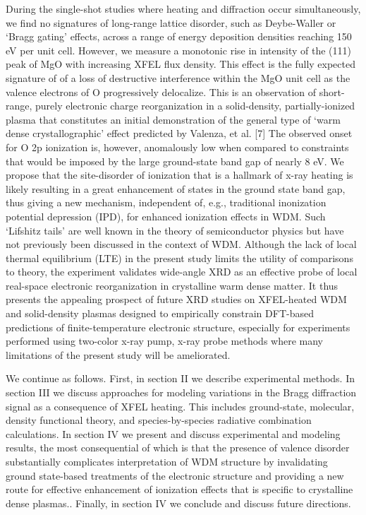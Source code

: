 During the single-shot studies where heating and diffraction occur
simultaneously, we find no signatures of long-range lattice disorder,
such as Deybe-Waller or `Bragg gating' effects, across a range of energy
deposition densities reaching 150 eV per unit cell. However, we measure
a monotonic rise in intensity of the (111) peak of MgO with increasing
XFEL flux density. This effect is the fully expected signature of of a
loss of destructive interference within the MgO unit cell as the valence
electrons of O progressively delocalize. This is an observation of
short-range, purely electronic charge reorganization in a solid-density,
partially-ionized plasma that constitutes an initial demonstration of
the general type of `warm dense crystallographic' effect predicted by
Valenza, et al. {[}7{]} The observed onset for O 2p ionization is,
however, anomalously low when compared to constraints that would be
imposed by the large ground-state band gap of nearly 8 eV. We propose
that the site-disorder of ionization that is a hallmark of x-ray heating
is likely resulting in a great enhancement of states in the ground state
band gap, thus giving a new mechanism, independent of, e.g., traditional
inonization potential depression (IPD), for enhanced ionization effects
in WDM. Such `Lifshitz tails' are well known in the theory of
semiconductor physics but have not previously been discussed in the
context of WDM. Although the lack of local thermal equilibrium (LTE) in
the present study limits the utility of comparisons to theory, the
experiment validates wide-angle XRD as an effective probe of local
real-space electronic reorganization in crystalline warm dense matter.
It thus presents the appealing prospect of future XRD studies on
XFEL-heated WDM and solid-density plasmas designed to empirically
constrain DFT-based predictions of finite-temperature electronic
structure, especially for experiments performed using two-color x-ray
pump, x-ray probe methods where many limitations of the present study
will be ameliorated.

We continue as follows. First, in section II we describe experimental
methods. In section III we discuss approaches for modeling variations in
the Bragg diffraction signal as a consequence of XFEL heating. This
includes ground-state, molecular, density functional theory, and
species-by-species radiative combination calculations. In section IV we
present and discuss experimental and modeling results, the most
consequential of which is that the presence of valence disorder
substantially complicates interpretation of WDM structure by
invalidating ground state-based treatments of the electronic structure
and providing a new route for effective enhancement of ionization
effects that is specific to crystalline dense plasmas.. Finally, in
section IV we conclude and discuss future directions.

